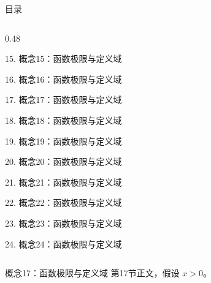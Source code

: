 \documentclass[aspectratio=169,10pt,fontset=fandol]{ctexbeamer}
\begin{document}
\begin{frame}[t,fragile]{目录}
\begin{columns}[T,onlytextwidth]
\begin{column}{0.48\textwidth}
{\color{black}\small 15. 概念15：函数极限与定义域\par}\vspace{0.22em}
{\color{black}\small 16. 概念16：函数极限与定义域\par}\vspace{0.22em}
{\color{blue}\small 17. 概念17：函数极限与定义域\par}\vspace{0.22em}
{\color{gray!40}\small 18. 概念18：函数极限与定义域\par}\vspace{0.22em}
{\color{gray!40}\small 19. 概念19：函数极限与定义域\par}\vspace{0.22em}
{\color{gray!40}\small 20. 概念20：函数极限与定义域\par}\vspace{0.22em}
{\color{gray!40}\small 21. 概念21：函数极限与定义域\par}\vspace{0.22em}
{\color{gray!40}\small 22. 概念22：函数极限与定义域\par}\vspace{0.22em}
{\color{gray!40}\small 23. 概念23：函数极限与定义域\par}\vspace{0.22em}
{\color{gray!40}\small 24. 概念24：函数极限与定义域\par}\vspace{0.22em}
\end{column}
\end{columns}
\end{frame}
\begin{frame}[t,fragile]{概念17：函数极限与定义域}
\normalsize
{\normalsize
第17节正文，假设 $x>0$。
}
\end{frame}
\end{document}
